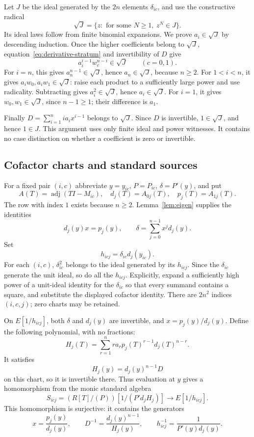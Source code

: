 \documentclass[11pt]{article}
\newcommand{\adj}{\operatorname{adj}}
\begin{document}
Let $J$ be the ideal generated by the $2n$ elements $\delta_{ic}$,
and use the constructive radical
\[
              \sqrt J=\{z:\text{ for some }N\geq1,\ z^N\in J\}.
\]
Its ideal laws follow from finite binomial expansions. We prove
$a_i\in\sqrt J$ by descending induction. Once the higher
coefficients belong to $\sqrt J$, equation~\eqref{eq:derivative-stratum}
and invertibility of $D$ give
\[
                 a_i^{i-1}w_c^{n-i}\in\sqrt J
                  \qquad(c=0,1).
\]
For $i=n$, this gives $a_n^{n-1}\in\sqrt J$, hence
$a_n\in\sqrt J$, because $n\geq2$.
For $1<i<n$, it gives $a_iw_0,a_iw_1\in\sqrt J$:
raise each product to a sufficiently large power and use radicality.
Subtracting gives $a_i^2\in\sqrt J$, hence $a_i\in\sqrt J$.
For $i=1$, it gives $w_0,w_1\in\sqrt J$, since $n-1\geq1$;
their difference is $a_1$.

Finally $D=\sum_{i=1}^n i a_i x^{i-1}$ belongs to $\sqrt J$.
Since $D$ is invertible, $1\in\sqrt J$, and hence $1\in J$.
This argument uses only finite ideal and power witnesses. It contains
no case distinction on whether a coefficient is zero or invertible.

\subsection{Cofactor charts and standard sources}

For a fixed pair $(i,c)$ abbreviate $y=y_{ic}$, $P=P_{ic}$,
$\delta=P'(y)$, and put
\[
 A(T)=\adj(TI-M_{ic}),\quad
 d_j(T)=A_{0j}(T),\quad p_j(T)=A_{1j}(T).
\]
The row with index $1$ exists because $n\geq2$.
Lemma~\ref{lem:eigen} supplies the identities
\[
      d_j(y)x=p_j(y),\qquad
      \delta=\sum_{j=0}^{n-1}x^j d_j(y).
\]
Set
\[
                    h_{icj}=\delta_{ic}d_j(y_{ic}).
\]
For each $(i,c)$, $\delta_{ic}^2$ belongs to the ideal generated by
its $h_{icj}$. Since the $\delta_{ic}$ generate the unit ideal, so
do all the $h_{icj}$. Explicitly, expand a sufficiently high power of
a unit-ideal identity for the $\delta_{ic}$ so that every summand
contains a square, and substitute the displayed cofactor identity.
There are $2n^2$ indices $(i,c,j)$; zero charts may be retained.

On $E[1/h_{icj}]$, both $\delta$ and $d_j(y)$ are invertible, and
$x=p_j(y)/d_j(y)$. Define the following polynomial, with no fractions:
\[
 H_j(T)=\sum_{r=1}^n r a_r p_j(T)^{r-1}d_j(T)^{n-r}.
\]
It satisfies
\[
                H_j(y)=d_j(y)^{n-1}D
\]
on this chart, so it is invertible there. Thus evaluation at $y$
gives a homomorphism from the monic standard algebra
\[
       S_{icj}=(R[T]/(P))[1/(P'd_jH_j)]
                  \longrightarrow E[1/h_{icj}].
\]
This homomorphism is surjective: it contains the generators
\[
 x=\frac{p_j(y)}{d_j(y)},\qquad
 D^{-1}=\frac{d_j(y)^{n-1}}{H_j(y)},\qquad
 h_{icj}^{-1}=\frac{1}{P'(y)d_j(y)}.
\]
\end{document}
